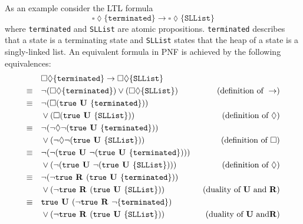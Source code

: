 \documentclass[a4paper, 12pt, twoside]{report}
\begin{document}
	As an example consider the LTL formula \[\square \lozenge \{\texttt{terminated}\} \rightarrow \square \lozenge \{\texttt{SLList}\}\] where \texttt{terminated} and \texttt{SLList} are atomic propositions. \texttt{terminated} describes that a state is a terminating state and \texttt{SLList} states that the heap of a state is a singly-linked list. An equivalent formula in PNF is achieved by the following equivalences:
	\begin{align*}
		&\square \lozenge \{\texttt{terminated}\} \rightarrow \square \lozenge \{\texttt{SLList}\} \\
		\equiv \quad &\neg(\square \lozenge \{\texttt{terminated}\}) \vee (\square \lozenge \{\texttt{SLList}\}) \qquad &(\text{definition of } \rightarrow) \\
		\equiv \quad &\neg(\square (\text{\texttt{true}} \text{\textbf{ U }} \{\texttt{terminated}\})) \\&\vee (\square (\text{\texttt{true}} \text{\textbf{ U }} \{\texttt{SLList}\})) \qquad &(\text{definition of } \lozenge) \\
		\equiv \quad &\neg(\neg\lozenge\neg (\text{\texttt{true}} \text{\textbf{ U }} \{\texttt{terminated}\}))\\ &\vee (\neg\lozenge\neg (\text{\texttt{true}} \text{\textbf{ U }} \{\texttt{SLList}\})) \qquad &(\text{definition of } \square) \\
		\equiv \quad &\neg(\neg(\text{\texttt{true}}  \text{\textbf{ U }} \neg (\text{\texttt{true}} \text{\textbf{ U }} \{\texttt{terminated}\})))\\ &\vee (\neg(\text{\texttt{true}} \text{\textbf{ U }} \neg (\text{\texttt{true}} \text{\textbf{ U }} \{\texttt{SLList}\}))) \qquad &(\text{definition of } \lozenge) \\
		\equiv \quad &\neg(\neg\text{\texttt{true}}  \text{\textbf{ R }} (\text{\texttt{true}} \text{\textbf{ U }} \{\texttt{terminated}\}))\\ &\vee (\neg\text{\texttt{true}} \text{\textbf{ R }} (\text{\texttt{true}} \text{\textbf{ U }} \{\texttt{SLList}\})) \qquad &(\text{duality of } \text{\textbf{U}} \text{ and } \text{\textbf{R}}) \\
		\equiv \quad &\text{\texttt{true}}  \text{\textbf{ U }} (\neg\text{\texttt{true}} \text{\textbf{ R }} \neg\{\texttt{terminated}\}) \\&\vee (\neg\text{\texttt{true}} \text{\textbf{ R }} (\text{\texttt{true}} \text{\textbf{ U }} \{\texttt{SLList}\})) \qquad &(\text{duality of } \text{\textbf{U}} \text{  and} \text{\textbf{R}}) \\
	\end{align*}	
	
\end{document}
